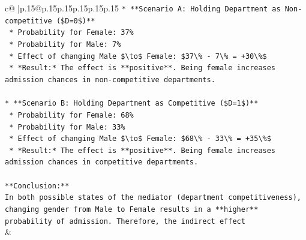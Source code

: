 \documentclass{article}
\begin{document}
{\begin{supertabular}{c@{$\;$}|p{.15\linewidth}@{}p{.15\linewidth}p{.15\linewidth}p{.15\linewidth}p{.15\linewidth}p{.15\linewidth}}
{{{\texttt{*   **Scenario A: Holding Department as Non{-}competitive (\$D=0\$)**} \\
\texttt{    *   Probability for Female: 37\%} \\
\texttt{    *   Probability for Male: 7\%} \\
\texttt{    *   Effect of changing Male \$\textbackslash{}to\$ Female: \$37\textbackslash{}\% {-} 7\textbackslash{}\% = +30\textbackslash{}\%\$} \\
\texttt{    *   *Result:* The effect is **positive**. Being female increases admission chances in non{-}competitive departments.} \\
\\ 
\texttt{*   **Scenario B: Holding Department as Competitive (\$D=1\$)**} \\
\texttt{    *   Probability for Female: 68\%} \\
\texttt{    *   Probability for Male: 33\%} \\
\texttt{    *   Effect of changing Male \$\textbackslash{}to\$ Female: \$68\textbackslash{}\% {-} 33\textbackslash{}\% = +35\textbackslash{}\%\$} \\
\texttt{    *   *Result:* The effect is **positive**. Being female increases admission chances in competitive departments.} \\
\\ 
\texttt{**Conclusion:**} \\
\texttt{In both possible states of the mediator (department competitiveness), changing gender from Male to Female results in a **higher** probability of admission. Therefore, the indirect effect} \\
            }
        }
    }
    & \\ \\


\end{supertabular}}
\end{document}
